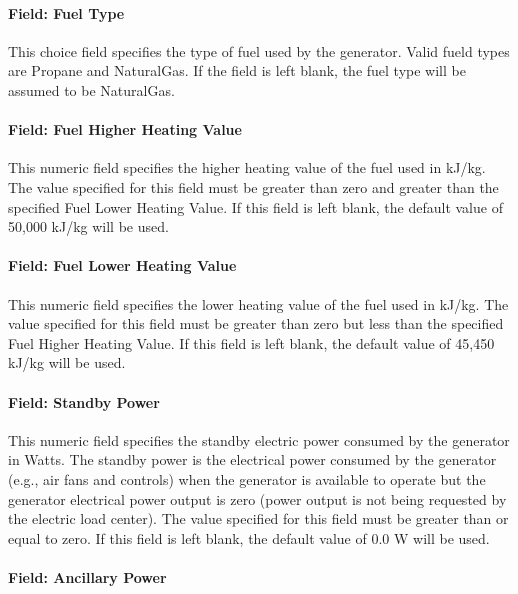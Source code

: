 \paragraph{Field: Fuel Type}\label{field-fuel-type-2}

This choice field specifies the type of fuel used by the generator. Valid fueld types are Propane and NaturalGas. If the field is left blank, the fuel type will be assumed to be NaturalGas.

\paragraph{Field: Fuel Higher Heating Value}\label{field-fuel-higher-heating-value-2}

This numeric field specifies the higher heating value of the fuel used in kJ/kg. The value specified for this field must be greater than zero and greater than the specified Fuel Lower Heating Value. If this field is left blank, the default value of 50,000 kJ/kg will be used.

\paragraph{Field: Fuel Lower Heating Value}\label{field-fuel-lower-heating-value}

This numeric field specifies the lower heating value of the fuel used in kJ/kg. The value specified for this field must be greater than zero but less than the specified Fuel Higher Heating Value. If this field is left blank, the default value of 45,450 kJ/kg will be used.

\paragraph{Field: Standby Power}\label{field-standby-power}

This numeric field specifies the standby electric power consumed by the generator in Watts. The standby power is the electrical power consumed by the generator (e.g., air fans and controls) when the generator is available to operate but the generator electrical power output is zero (power output is not being requested by the electric load center). The value specified for this field must be greater than or equal to zero. If this field is left blank, the default value of 0.0 W will be used.

\paragraph{Field: Ancillary Power}\label{field-ancillary-power}

